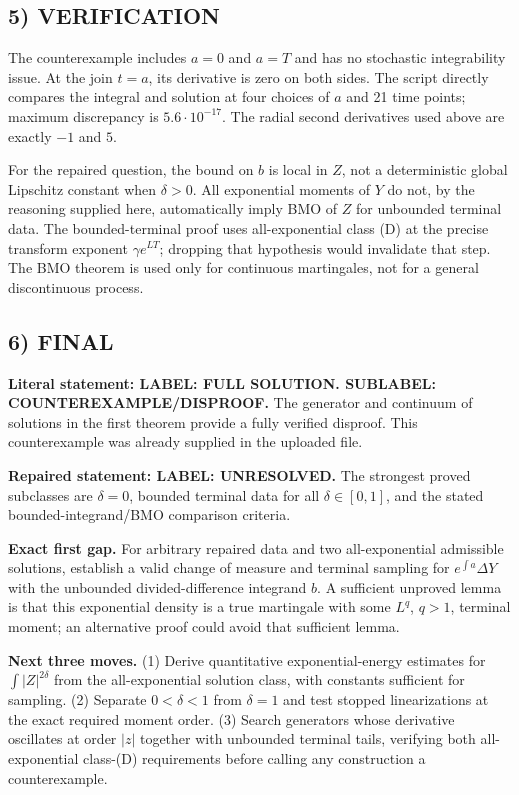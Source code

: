 \documentclass[11pt,a4paper]{article}
\theoremstyle{definition}
\begin{document}
\subsection*{5) VERIFICATION}
The counterexample includes $a=0$ and $a=T$ and has no stochastic integrability issue. At the join $t=a$, its derivative is zero on both sides. The script directly compares the integral and solution at four choices of $a$ and 21 time points; maximum discrepancy is $5.6\cdot10^{-17}$. The radial second derivatives used above are exactly $-1$ and $5$.

For the repaired question, the bound on $b$ is local in $Z$, not a deterministic global Lipschitz constant when $\delta>0$. All exponential moments of $Y$ do not, by the reasoning supplied here, automatically imply BMO of $Z$ for unbounded terminal data. The bounded-terminal proof uses all-exponential class (D) at the precise transform exponent $\gamma e^{LT}$; dropping that hypothesis would invalidate that step. The BMO theorem is used only for continuous martingales, not for a general discontinuous process.

\subsection*{6) FINAL}
\textbf{Literal statement: LABEL: FULL SOLUTION. SUBLABEL: COUNTEREXAMPLE/DISPROOF.}
The generator and continuum of solutions in the first theorem provide a fully verified disproof. This counterexample was already supplied in the uploaded file.

\textbf{Repaired statement: LABEL: UNRESOLVED.}
The strongest proved subclasses are $\delta=0$, bounded terminal data for all $\delta\in[0,1]$, and the stated bounded-integrand/BMO comparison criteria.

\textbf{Exact first gap.} For arbitrary repaired data and two all-exponential admissible solutions, establish a valid change of measure and terminal sampling for
$e^{\int a}\Delta Y$ with the unbounded divided-difference integrand $b$. A sufficient unproved lemma is that this exponential density is a true martingale with some $L^q$, $q>1$, terminal moment; an alternative proof could avoid that sufficient lemma.

\textbf{Next three moves.} (1) Derive quantitative exponential-energy estimates for $\int|Z|^{2\delta}$ from the all-exponential solution class, with constants sufficient for sampling. (2) Separate $0<\delta<1$ from $\delta=1$ and test stopped linearizations at the exact required moment order. (3) Search generators whose derivative oscillates at order $|z|$ together with unbounded terminal tails, verifying both all-exponential class-(D) requirements before calling any construction a counterexample.
\end{document}

